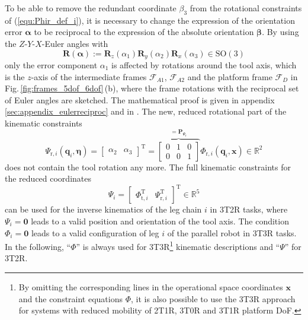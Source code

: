 \documentclass[robotics,article,submit,moreauthors,pdftex]{Definitions/mdpi}
\newcommand{\bm}[1]{\boldsymbol{#1}}
\newcommand{\transp}[0]{{\mathrm{T}}}
\newcommand{\ks}[1]{{\mathcal{F}}_{#1}}
\let\Phi\varPhi
\let\Psi\varPsi
\begin{document}
To be able to remove the redundant coordinate $\beta_3$ from the rotational constraints of (\ref{equ:Phir_def_i}), it is necessary to change the expression of the orientation error $\bm{\alpha}$ to be reciprocal to the expression of the absolute orientation $\bm{\beta}$.
By using the $Z$-$Y$-$X$-Euler angles with
%
\begin{equation}
\bm{R}(\bm{\alpha}) := \bm{R}_z(\alpha_1) \bm{R}_y(\alpha_2) \bm{R}_x(\alpha_3) \in \mathrm{SO(3)}
\label{equ:def_rmat_zyxr}
\end{equation}
%
only the error component $\alpha_1$ is affected by rotations around the tool axis, which is the $z$-axis of the intermediate frames $\ks{A1}$, $\ks{A2}$ and the platform frame $\ks{D}$ in Fig.\,\ref{fig:frames_5dof_6dof}\,(b), where the frame rotations with the reciprocal set of Euler angles are sketched.
The mathematical proof is given in appendix\,\ref{sec:appendix_eulerreciproc} and in \cite{1_SchapplerTapOrt2019}.
%
The new, reduced rotational part of the kinematic constraints
%
\begin{equation}
\bm{\Psi}_{\mathrm{r},i}(\bm{q}_i,\bm{\eta}) = 
\begin{bmatrix}
\alpha_2  & \alpha_3
\end{bmatrix}^\transp
=
\overbrace{\begin{bmatrix}
    0 & 1 & 0  \\ 
    0 & 0 & 1
    \end{bmatrix}}^{=\bm{P}_{\bm{\Psi}_\mathrm{r}}}
\bm{\Phi}_{\mathrm{r},i} (\bm{q}_i,\bm{x})
\in {\mathbb{R}}^{2}
\label{equ:Psir_def}
\end{equation}
%
does not contain the tool rotation any more.
The full kinematic constraints for the reduced coordinates
%
\begin{equation}
\bm{\Psi}_i=\begin{bmatrix}
\bm{\Phi}_{\mathrm{t},i}^\transp & \bm{\Psi}_{\mathrm{r},i}^\transp
\end{bmatrix}^\transp \in {\mathbb{R}}^{5}
\label{equ:Psi_def}
\end{equation}
%
can be used for the inverse kinematics of the leg chain $i$ in 3T2R tasks, where $\bm{\Psi}_i=\bm{0}$ leads to a valid position and orientation of the tool axis.
The condition $\bm{\Phi}_i=\bm{0}$ leads to a valid configuration of leg $i$ of the parallel robot in 3T3R tasks.
In the following, ``$\bm{\Phi}$'' is always used for 3T3R\footnote{By omitting the corresponding lines in the operational space coordinates $\bm{x}$ and the constraint equations $\bm{\Phi}$, it is also possible to use the 3T3R approach for systems with reduced mobility of 2T1R, 3T0R and 3T1R platform DoF.} kinematic descriptions and ``$\bm{\Psi}$'' for 3T2R.
\end{document}
